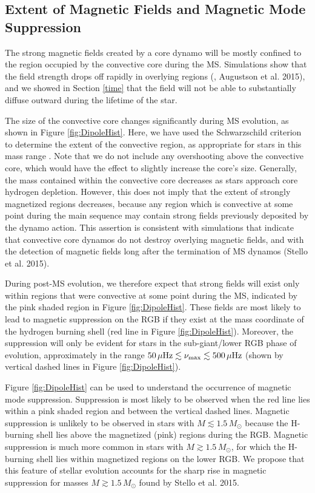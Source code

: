 \subsection{Extent of Magnetic Fields and Magnetic Mode Suppression}
\label{rgb}

The strong magnetic fields created by a core dynamo will be mostly confined to the region occupied by the convective core during the MS. Simulations show that the field strength drops off rapidly in overlying regions (\citealt{Featherstone_2009}, Augustson et al. 2015), and we showed in Section \ref{time} that the field will not be able to substantially diffuse outward during the lifetime of the star. 

The size of the convective core changes significantly during MS evolution, as shown in Figure \ref{fig:DipoleHist}. Here, we have used the Schwarzschild criterion to determine the extent of the convective region, as appropriate for stars in this mass range \citep{Moore_2015}. Note that we do not include any  overshooting above the convective core, which would have the effect to slightly increase the core's size. Generally, the mass contained within the convective core decreases as stars approach core hydrogen depletion. However, this does not imply that the extent of strongly magnetized regions decreases, because any region which is convective at some point during the main sequence may contain strong fields previously deposited by the dynamo action. This assertion is consistent with simulations \citep{Featherstone_2009} that indicate that convective core dynamos do not destroy overlying magnetic fields, and with the detection of magnetic fields long after the termination of MS dynamos (Stello et al. 2015).

During post-MS evolution, we therefore expect that strong fields will exist only within regions that were convective at some point during the MS, indicated by the pink shaded region in Figure \ref{fig:DipoleHist}. These fields are most likely to lead to magnetic suppression on the RGB if they exist at the mass coordinate of the hydrogen burning shell (red line in Figure \ref{fig:DipoleHist}). Moreover, the suppression will only be evident for stars in the sub-giant/lower RGB phase of evolution, approximately in the range $50 \, \mu {\rm Hz} \lesssim \nu_{\rm max} \lesssim 500 \, \mu {\rm Hz}$ (shown by vertical dashed lines in Figure \ref{fig:DipoleHist}).

Figure \ref{fig:DipoleHist} can  be used to understand the occurrence of magnetic mode suppression. Suppression is most likely to be observed when the red line lies within a pink shaded region and between the vertical dashed lines. Magnetic suppression is unlikely to be observed in stars with $M \lesssim 1.5 \, M_\odot$ because the H-burning shell lies above the magnetized (pink) regions during the RGB. Magnetic suppression is much more common in stars with $M \gtrsim 1.5 \, M_\odot$, for which the H-burning shell lies within magnetized regions on the lower RGB. We propose that this feature of stellar evolution accounts for the sharp rise in magnetic suppression for masses $M \gtrsim 1.5 \, M_\odot$ found by Stello et al. 2015.

    
    
  
  